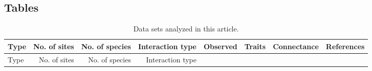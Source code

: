 \newpage

\subsection{Tables}\label{tables}

\begin{longtable}[]{@{}lrrrrrrr@{}}
\caption{Data sets analyzed in this article.
\label{tbl:data}}\tabularnewline
\toprule
\begin{minipage}[b]{0.15\columnwidth}\raggedright\strut
Type\strut
\end{minipage} & \begin{minipage}[b]{0.07\columnwidth}\raggedleft\strut
No. of sites\strut
\end{minipage} & \begin{minipage}[b]{0.07\columnwidth}\raggedleft\strut
No. of species\strut
\end{minipage} & \begin{minipage}[b]{0.11\columnwidth}\raggedleft\strut
Interaction type\strut
\end{minipage} & \begin{minipage}[b]{0.05\columnwidth}\raggedleft\strut
Observed\strut
\end{minipage} & \begin{minipage}[b]{0.04\columnwidth}\raggedleft\strut
Traits\strut
\end{minipage} & \begin{minipage}[b]{0.06\columnwidth}\raggedleft\strut
Connectance\strut
\end{minipage} & \begin{minipage}[b]{0.22\columnwidth}\raggedleft\strut
References\strut
\end{minipage}\tabularnewline
\midrule
\endfirsthead
\toprule
\begin{minipage}[b]{0.15\columnwidth}\raggedright\strut
Type\strut
\end{minipage} & \begin{minipage}[b]{0.07\columnwidth}\raggedleft\strut
No. of sites\strut
\end{minipage} & \begin{minipage}[b]{0.07\columnwidth}\raggedleft\strut
No. of species\strut
\end{minipage} & \begin{minipage}[b]{0.11\columnwidth}\raggedleft\strut
Interaction type\strut
\end{minipage} & \begin{minipage}[b]{0.05\columnwidth}\raggedleft\strut

\end{minipage}
\end{longtable}
